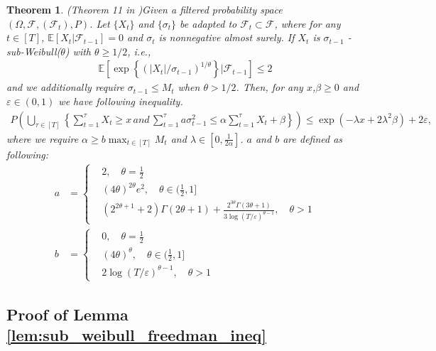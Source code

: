 \documentclass{article}
\newtheorem{theorem}{Theorem}
\def \E {\mathbb{E}}
\begin{document}
\begin{theorem}{(Theorem 11 in \citep{madden_2024})}\label{app_thm:sub_weibull_freedman_ineq}
Given a filtered probability space $(\Omega,\mathcal{F},(\mathcal{F}_t),P)$. Let $\{X_t\}$ and $\{\sigma_t\}$ be adapted to $\mathcal{F}_t\subset \mathcal{F}$, where for any $t\in[T]$, $\E[X_t|\mathcal{F}_{t-1}]=0$ and $\sigma_t$ is nonnegative almost surely. If $X_t$ is $\sigma_{t-1}$ - sub-Weibull($\theta$) with $\theta\geq1/2$, i.e.,
\begin{align}
    \E\left[\exp\left\{(|X_t|/\sigma_{t-1})^{1/\theta}\right\}|\mathcal{F}_{t-1}\right]\leq 2
\end{align}
and we additionally require $\sigma_{t-1}\leq M_t$ when $ \theta>1/2$. Then, for any $x$,$\beta\geq0$ and $\varepsilon\in(0,1)$ we have following inequality.
\begin{align}
    P\left(\bigcup_{\tau\in[T]}\left\{\sum_{t=1}^\tau X_t\geq x\,and\,\sum_{t=1}^\tau a \sigma_{t-1}^2\leq \alpha\sum_{t=1}^\tau X_t+\beta \right\}\right)\leq \exp(-\lambda x+2\lambda^2\beta)+2\varepsilon,
\end{align}
where we require $\alpha\geq b\max_{t\in[T]}M_t$ and $\lambda\in[0,\frac{1}{2\alpha}]$. $a$ and $b$ are defined as following:
\begin{align}
    a &= \left\{\begin{aligned}
        &2,\quad \theta = \frac{1}{2}\\
        &(4\theta)^{2\theta}e^2,\quad \theta\in(\frac{1}{2},1]\\
        &(2^{2\theta+1}+2)\Gamma(2\theta+1) + \frac{2^{3\theta}\Gamma(3\theta+1)}{3\log(T/\varepsilon)^{\theta-1}}, \quad \theta>1
    \end{aligned}\right.\\
    b &= \left\{\begin{aligned}
        &0,\quad \theta = \frac{1}{2}\\
        &(4\theta)^\theta,\quad \theta \in (\frac{1}{2},1]\\
        &2\log(T/\varepsilon)^{\theta-1},\quad \theta > 1
    \end{aligned}\right.
\end{align}
\end{theorem}

\subsection{Proof of Lemma \ref{lem:sub_weibull_freedman_ineq}}
\end{document}
